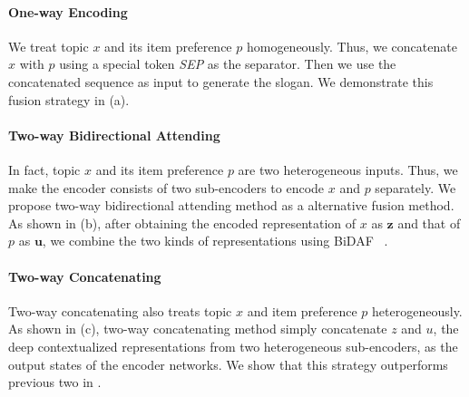\paragraph{One-way Encoding}
We treat topic $x$ and its item preference $p$ homogeneously.
Thus, we concatenate $x$ with $p$ using a special token \emph{SEP} as the separator. Then we use the concatenated sequence as input to generate the 
slogan.
We demonstrate this fusion strategy in  (a).


\paragraph{Two-way Bidirectional Attending}
In fact, topic $x$ and its item preference $p$ are two heterogeneous inputs. Thus, we make the encoder consists of two sub-encoders to 
encode $x$ and $p$ separately.
We propose two-way bidirectional attending method as 
a alternative fusion method.
As shown in  (b), after obtaining the encoded representation of $x$ as $\textbf{z}$ and that of $p$ as $\textbf{u}$, we combine the two kinds of representations using BiDAF ~\cite{seo2016bidirectional}.

\paragraph{Two-way Concatenating}
Two-way concatenating also treats topic $x$ and item preference $p$ heterogeneously.
As shown in  (c),
two-way concatenating method simply concatenate $z$ and $u$, the deep contextualized representations from two heterogeneous sub-encoders, as the output states of the encoder networks.
We show that this strategy outperforms previous two in .




